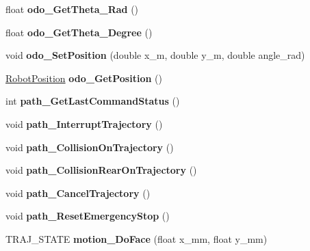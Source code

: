 \begin{DoxyCompactItemize}
float {\bfseries odo\+\_\+\+Get\+Theta\+\_\+\+Rad} ()
\item 
\mbox{\label{classAsservDriver_af764eb227ab106c4dde5c4642cf42e6e}} 
float {\bfseries odo\+\_\+\+Get\+Theta\+\_\+\+Degree} ()
\item 
\mbox{\label{classAsservDriver_a4b33794f81ea6c66cd04e1ef1d369868}} 
void {\bfseries odo\+\_\+\+Set\+Position} (double x\+\_\+m, double y\+\_\+m, double angle\+\_\+rad)
\item 
\mbox{\label{classAsservDriver_a0a62fbec28bfc5510eb75b6ad434baed}} 
\hyperlink{structRobotPosition}{Robot\+Position} {\bfseries odo\+\_\+\+Get\+Position} ()
\item 
\mbox{\label{classAsservDriver_ac4b8627777e76c145265a8e988852484}} 
int {\bfseries path\+\_\+\+Get\+Last\+Command\+Status} ()
\item 
\mbox{\label{classAsservDriver_affc4e315cdd03c826cea17114d02a19c}} 
void {\bfseries path\+\_\+\+Interrupt\+Trajectory} ()
\item 
\mbox{\label{classAsservDriver_a6af616f39706df060f1b81b2047c7a7f}} 
void {\bfseries path\+\_\+\+Collision\+On\+Trajectory} ()
\item 
\mbox{\label{classAsservDriver_a370b2f287b352211c07a023edcb63bc7}} 
void {\bfseries path\+\_\+\+Collision\+Rear\+On\+Trajectory} ()
\item 
\mbox{\label{classAsservDriver_a7f18af77a8524e09f8c9b024d4f0e4b8}} 
void {\bfseries path\+\_\+\+Cancel\+Trajectory} ()
\item 
\mbox{\label{classAsservDriver_aa54769b7bbe83fefa64925aa60089096}} 
void {\bfseries path\+\_\+\+Reset\+Emergency\+Stop} ()
\item 
\mbox{\label{classAsservDriver_af7b023caadc3314c7640c98378829636}} 
T\+R\+A\+J\+\_\+\+S\+T\+A\+TE {\bfseries motion\+\_\+\+Do\+Face} (float x\+\_\+mm, float y\+\_\+mm)
\item 
\mbox{\label{classAsservDriver_a4ac101bd479baeecf76fd0d6be63421d}} 

\end{DoxyCompactItemize}
